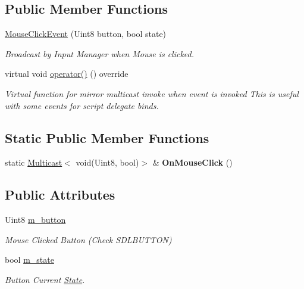 \subsection*{Public Member Functions}
\begin{DoxyCompactItemize}
\item 
\hyperlink{classMouseClickEvent_aaeb5699200d246773b7be56e1565171e}{Mouse\+Click\+Event} (Uint8 button, bool state)
\begin{DoxyCompactList}\small\item\em Broadcast by Input Manager when Mouse is clicked. \end{DoxyCompactList}\item 
\mbox{\label{classMouseClickEvent_abe4372608df6a6e493016d61f1f3519b}} 
virtual void \hyperlink{classMouseClickEvent_abe4372608df6a6e493016d61f1f3519b}{operator()} () override
\begin{DoxyCompactList}\small\item\em Virtual function for mirror multicast invoke when event is invoked This is useful with some events for script delegate binds. \end{DoxyCompactList}\end{DoxyCompactItemize}
\subsection*{Static Public Member Functions}
\begin{DoxyCompactItemize}
\item 
\mbox{\label{classMouseClickEvent_a16aa7c82bd938571b3221dcf5f05bf12}} 
static \hyperlink{classMulticast}{Multicast}$<$ void(Uint8, bool)$>$ \& {\bfseries On\+Mouse\+Click} ()
\end{DoxyCompactItemize}
\subsection*{Public Attributes}
\begin{DoxyCompactItemize}
\item 
\mbox{\label{classMouseClickEvent_ace1e345571c6fc864024dc753f39bdb1}} 
Uint8 \hyperlink{classMouseClickEvent_ace1e345571c6fc864024dc753f39bdb1}{m\+\_\+button}
\begin{DoxyCompactList}\small\item\em Mouse Clicked Button (Check S\+D\+L\+B\+U\+T\+T\+ON) \end{DoxyCompactList}\item 
\mbox{\label{classMouseClickEvent_aff463f4701ac788b3002804fa670e7a4}} 
bool \hyperlink{classMouseClickEvent_aff463f4701ac788b3002804fa670e7a4}{m\+\_\+state}
\begin{DoxyCompactList}\small\item\em Button Current \hyperlink{classState}{State}. \end{DoxyCompactList}\end{DoxyCompactItemize}
